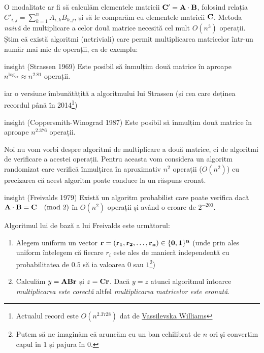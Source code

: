 \documentclass[]{article}
\let\rmarkdownfootnote\footnote%
\def\footnote{\protect\rmarkdownfootnote}
\newenvironment{frshaded_insight*}{%
  \def\FrameCommand{\fboxrule=\FrameRule\fboxsep=\FrameSep \fcolorbox{framecolor_insight}{shadecolor_insight}}%
  \MakeFramed {\advance\hsize-\width \FrameRestore}}%
{\endMakeFramed}
\newenvironment{rmdblock_insight}[1]
  {\begin{frshaded_insight*}
  \begin{itemize}
  \renewcommand{\labelitemi}{
    \raisebox{-.7\height}[0pt][0pt]{
      {\setkeys{Gin}{width=2em,keepaspectratio}\texttt{[image: images/icons/\#1]}}
    }
  }
  \item
  }
  {
  \end{itemize}
  \end{frshaded_insight*}
  }
\newenvironment{rmdinsight}
  {\begin{rmdblock_insight}{insight}}
  {\end{rmdblock_insight}}
\begin{document}
O modalitate ar fi să calculăm elementele matricii
\(\bf{C}'=\bf{A}\cdot\bf{B}\), folosind relația
\(C'_{i,j} = \sum_{k=1}^{n}A_{i,k}B_{k,j}\), și să le comparăm cu
elementele matricii \(\bf{C}\). Metoda \emph{naivă} de multiplicare a
celor două matrice necesită cel mult \(O(n^3)\) operații. Știm că există
algoritmi (netriviali) care permit multiplicarea matricelor într-un
număr mai mic de operații, ca de exemplu:

\begin{rmdinsight}
(Strassen 1969) Este posibil să înmulțim două matrice în aproape
\(n^{\log_27}\approx n^{2.81}\) operații.
\end{rmdinsight}

iar o versiune îmbunătățită a algoritmului lui Strassen (și cea care
deținea recordul până în 2014\footnote{Actualul record este
  \(O(n^{2.3728})\) dat de
  \href{http://theory.stanford.edu/~virgi/matrixmult-f.pdf}{Vassilevska
  Williams}})

\begin{rmdinsight}
(Coppersmith-Winograd 1987) Este posibil să înmulțim două matrice în
aproape \(n^{2.376}\) operații.
\end{rmdinsight}

Noi nu vom vorbi despre algoritmi de multiplicare a două matrice, ci de
algoritmi de verificare a acestei operații. Pentru aceasta vom considera
un algoritm randomizat care verifică înmulțirea în aproximativ \(n^2\)
operații (\(O(n^2)\)) cu precizarea că acest algoritm poate conduce la
un răspuns eronat.

\begin{rmdinsight}
(Freivalds 1979) Există un algoritm probabilist care poate verifica dacă
\(\bf{A}\cdot\bf{B}=\bf{C} \quad (\text{mod 2})\) în \(O(n^2)\) operații
și având o eroare de \(2^{-200}\).
\end{rmdinsight}

Algoritmul lui de bază a lui Freivalds este următorul:

\begin{enumerate}
\def\labelenumi{\arabic{enumi}.}
\item
  Alegem uniform un vector \(\bf{r}=(r_1,r_2,\ldots,r_n)\in\{0,1\}^n\)
  (unde prin ales uniform înțelegem că fiecare \(r_i\) este ales de
  manieră independentă cu probabilitatea de \(0.5\) să ia valoarea \(0\)
  sau \(1\)\footnote{Putem să ne imaginăm că aruncăm cu un ban
    echilibrat de \(n\) ori și convertim capul în \(1\) și pajura în
    \(0\).})
\item
  Calculăm \(y = \bf{A}\bf{B}\bf{r}\) și \(z = \bf{C}\bf{r}\). Dacă
  \(y = z\) atunci algoritmul întoarce \emph{multiplicarea este corectă}
  altfel \emph{multiplicarea matricelor este eronată}.
\end{enumerate}
\end{document}
